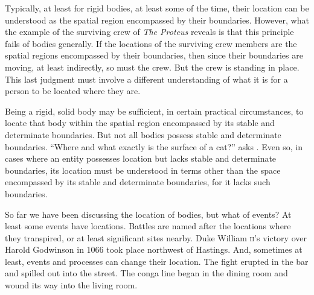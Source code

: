 Typically, at least for rigid bodies, at least some of the time, their location can be understood as the spatial region encompassed by their boundaries. However, what the example of the surviving crew of \emph{The Proteus} reveals is that this principle fails of bodies generally. If the locations of the surviving crew members are the spatial regions encompassed by their boundaries, then since their boundaries are moving, at least indirectly, so must the crew. But the crew is standing in place. This last judgment must involve a different understanding of what it is for a person to be located where they are.

Being a rigid, solid body may be sufficient, in certain practical circumstances, to locate that body within the spatial region encompassed by its stable and determinate boundaries. But not all bodies possess stable and determinate boundaries. ``Where and what exactly is the surface of a cat?'' asks \citet[lecture 9]{Austin:1962lr}. Even so, in cases where an entity possesses location but lacks stable and determinate boundaries, its location must be understood in terms other than the space encompassed by its stable and determinate boundaries, for it lacks such boundaries.

So far we have been discussing the location of bodies, but what of events? At least some events have locations. Battles are named after the locations where they transpired, or at least significant sites nearby. Duke William \textsc{ii}'s victory over Harold Godwinson in 1066 took place northwest of Hastings. And, sometimes at least, events and processes can change their location. The fight erupted in the bar and spilled out into the street. The conga line began in the dining room and wound its way into the living room.

